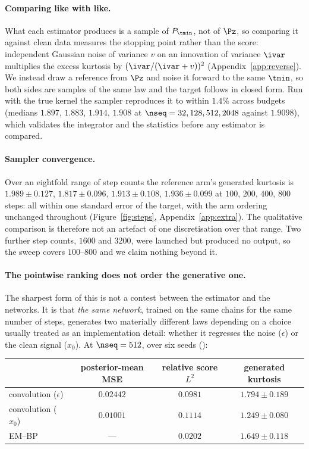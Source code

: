 \documentclass{article}
\begin{document}
\paragraph{Comparing like with like.} What each estimator produces is a sample of $P_{\tmin}$,
not of $\Pz$, so comparing it against clean data measures the stopping point rather than the
score: independent Gaussian noise of variance $v$ on an innovation of variance $\ivar$ multiplies
the excess kurtosis by $(\ivar/(\ivar+v))^2$ (Appendix~\ref{app:reverse}). We instead draw a
reference from $\Pz$ and noise it forward to the same $\tmin$, so both sides are samples of the
same law and the target follows in closed form. Run with the true kernel the sampler reproduces
it to within $1.4\%$ across budgets (medians $1.897$, $1.883$, $1.914$, $1.908$ at
$\nseq=32,128,512,2048$ against $1.9098$), which validates the integrator and the statistics
before any estimator is compared.

\paragraph{Sampler convergence.} Over an eightfold range of step counts the reference arm's
generated kurtosis is $1.989\pm0.127$, $1.817\pm0.096$, $1.913\pm0.108$, $1.936\pm0.099$ at
$100$, $200$, $400$, $800$ steps: all within one standard error of the target, with the arm
ordering unchanged throughout (Figure~\ref{fig:steps}, Appendix~\ref{app:extra}). The qualitative comparison is therefore
not an artefact of one discretisation over that range. Two further step counts, $1600$ and
$3200$, were launched but produced no output, so the sweep covers $100$--$800$ and we claim
nothing beyond it.

\paragraph{The pointwise ranking does not order the generative one.} The sharpest form of this is
not a contest between the estimator and the networks. It is that \emph{the same network}, trained
on the same chains for the same number of steps, generates two materially different laws
depending on a choice usually treated as an implementation detail: whether it regresses the noise
($\epsilon$) or the clean signal ($x_0$). At $\nseq=512$, over six seeds
():

\begin{center}\small
\begin{tabular}{@{}lccc@{}}
\toprule
& posterior-mean MSE & relative score $L^2$ & generated kurtosis \\
\midrule
convolution ($\epsilon$) & $0.02442$          & $\mathbf{0.0981}$ & $1.794\pm0.189$ \\
convolution ($x_0$)      & $\mathbf{0.01001}$ & $0.1114$          & $1.249\pm0.080$ \\
EM--BP                   & ---                & $0.0202$          & $1.649\pm0.118$ \\
\bottomrule
\end{tabular}
\end{center}
\end{document}
